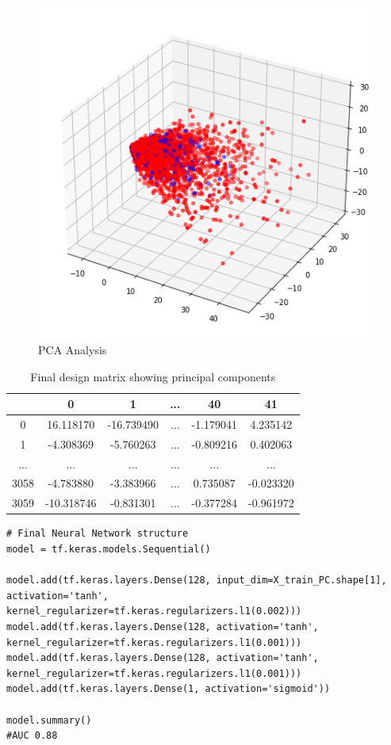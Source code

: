 \documentclass[12pt]{article}
\begin{document}
\begin{figure}[ht!]
  \begin{center}
    \includegraphics[scale=0.7]{"./Diagrams/PCA.png"}
    \caption{PCA Analysis}
    \label{figure:1}
  \end{center}
\end{figure}
\pagebreak

\begin{table}[ht!]
  \centering
  \bgroup
  \def\arraystretch{1.5}%
  \begin{tabular}{|c|c c c c c|}
    \hline
         & 0          & 1          & ... & 40        & 41        \\
    \hline
    0    & 16.118170  & -16.739490 & ... & -1.179041 & 4.235142  \\
    1    & -4.308369  & -5.760263  & ... & -0.809216 & 0.402063  \\
    ...  & ...        & ...        & ... & ...       & ...       \\
    3058 & -4.783880  & -3.383966  & ... & 0.735087  & -0.023320 \\
    3059 & -10.318746 & -0.831301  & ... & -0.377284 & -0.961972 \\
    \hline
  \end{tabular}
  \egroup
  \caption{Final design matrix showing principal components}
  \label{table:2}
\end{table}


\label{code:2}\begin{lstlisting}[caption={Neural Network Structure}]
# Final Neural Network structure
model = tf.keras.models.Sequential()

model.add(tf.keras.layers.Dense(128, input_dim=X_train_PC.shape[1], activation='tanh', kernel_regularizer=tf.keras.regularizers.l1(0.002)))
model.add(tf.keras.layers.Dense(128, activation='tanh', kernel_regularizer=tf.keras.regularizers.l1(0.001)))
model.add(tf.keras.layers.Dense(128, activation='tanh', kernel_regularizer=tf.keras.regularizers.l1(0.001)))
model.add(tf.keras.layers.Dense(1, activation='sigmoid'))

model.summary()
#AUC 0.88
\end{lstlisting}
\end{document}
